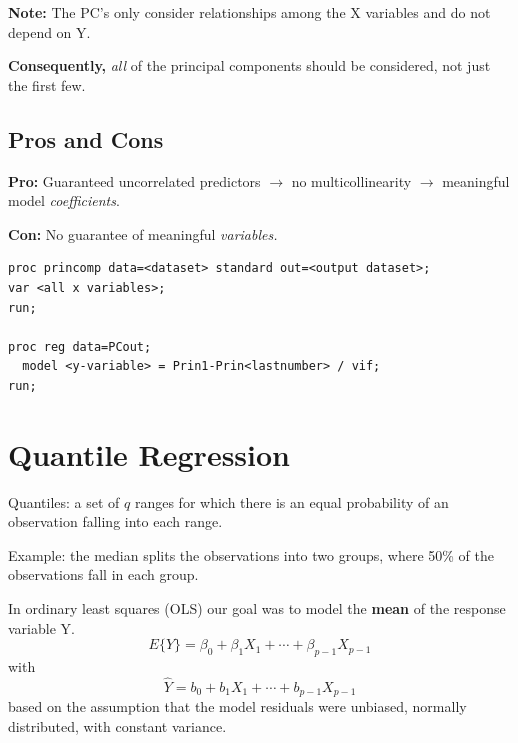 \documentclass[12pt]{notes}
\begin{document}
\textbf{Note:} The PC's only consider relationships among the X variables and do not depend on Y. 

\nspace
\textbf{Consequently,} \textit{all} of the principal components should be considered, not just the first few. 


\begin{minipage}[l][2cm][c]{\textwidth}

\end{minipage}

\subsection{Pros and Cons}
\bi
\item \textbf{Pro:} Guaranteed uncorrelated predictors $\rightarrow$ no multicollinearity $\rightarrow$ meaningful model \textit{coefficients}. 
\item \textbf{Con:} No guarantee of meaningful \textit{variables.}
\ei

\begin{verbatim}
proc princomp data=<dataset> standard out=<output dataset>;
var <all x variables>;
run;

proc reg data=PCout;
  model <y-variable> = Prin1-Prin<lastnumber> / vif;
run;
\end{verbatim}

\section{Quantile Regression}
Quantiles: a set of $q$ ranges for which there is an equal probability of an observation falling into each range. 
\bi
\item Example: the median splits the observations into two groups, where 50\% of the observations fall in each group. 
\ei

In ordinary least squares (OLS) our goal was to model the \textbf{mean} of the response variable Y. 
$$E\{Y\} = \beta_0 + \beta_1X_1 + \cdots + \beta_{p-1}X_{p-1}$$
with 
$$\hat{Y} = b_0 + b_1X_1 + \cdots + b_{p-1}X_{p-1}$$
based on the assumption that the model residuals were unbiased, normally distributed, with constant variance. 
\end{document}
